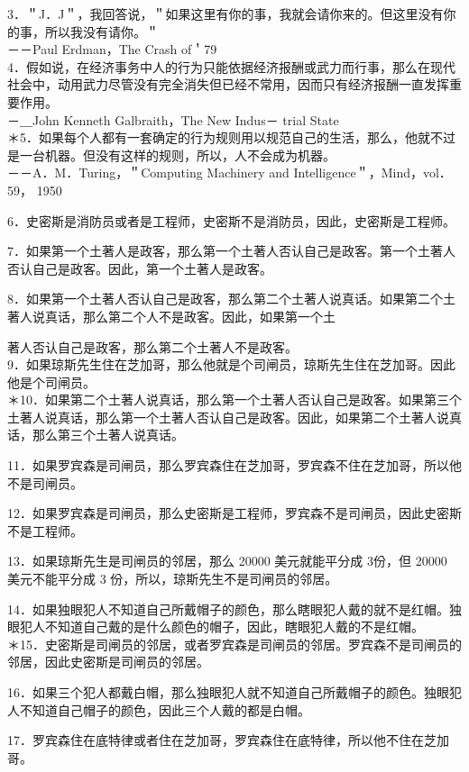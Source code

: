 3．＂J．J＂，我回答说，＂如果这里有你的事，我就会请你来的。但这里没有你的事，所以我没有请你。＂\\
－－Paul Erdman，The Crash of＇79\\
4．假如说，在经济事务中人的行为只能依据经济报酬或武力而行事，那么在现代社会中，动用武力尽管没有完全消失但已经不常用，因而只有经济报酬一直发挥重要作用。\\
－＿John Kenneth Galbraith，The New Indus－ trial State\\
＊5．如果每个人都有一套确定的行为规则用以规范自己的生活，那么，他就不过是一台机器。但没有这样的规则，所以，人不会成为机器。\\
－－A．M．Turing，＂Computing Machinery and Intelligence＂，Mind，vol．59， 1950

6．史密斯是消防员或者是工程师，史密斯不是消防员，因此，史密斯是工程师。

7．如果第一个土著人是政客，那么第一个土著人否认自己是政客。第一个土著人否认自己是政客。因此，第一个土著人是政客。

8．如果第一个土著人否认自己是政客，那么第二个土著人说真话。如果第二个土著人说真话，那么第二个人不是政客。因此，如果第一个土

著人否认自己是政客，那么第二个土著人不是政客。\\
9．如果琼斯先生住在芝加哥，那么他就是个司闸员，琼斯先生住在芝加哥。因此他是个司闸员。\\
＊10．如果第二个土著人说真话，那么第一个土著人否认自己是政客。如果第三个土著人说真话，那么第一个土著人否认自己是政客。因此，如果第二个土著人说真话，那么第三个土著人说真话。

11．如果罗宾森是司闸员，那么罗宾森住在芝加哥，罗宾森不住在芝加哥，所以他不是司闸员。

12．如果罗宾森是司闸员，那么史密斯是工程师，罗宾森不是司闸员，因此史密斯不是工程师。

13．如果琼斯先生是司闸员的邻居，那么 20000 美元就能平分成 3份，但 20000 美元不能平分成 3 份，所以，琼斯先生不是司闸员的邻居。

14．如果独眼犯人不知道自己所戴帽子的颜色，那么瞎眼犯人戴的就不是红帽。独眼犯人不知道自己戴的是什么颜色的帽子，因此，瞎眼犯人戴的不是红帽。\\
＊15．史密斯是司闸员的邻居，或者罗宾森是司闸员的邻居。罗宾森不是司闸员的邻居，因此史密斯是司闸员的邻居。

16．如果三个犯人都戴白帽，那么独眼犯人就不知道自己所戴帽子的颜色。独眼犯人不知道自己帽子的颜色，因此三个人戴的都是白帽。

17．罗宾森住在底特律或者住在芝加哥，罗宾森住在底特律，所以他不住在芝加哥。

